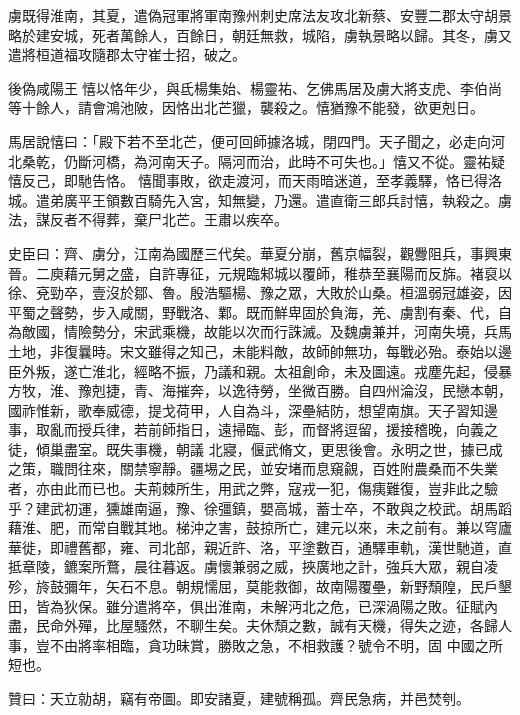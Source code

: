 \begin{pinyinscope}
 虜既得淮南，其夏，遣偽冠軍將軍南豫州刺史席法友攻北新蔡、安豐二郡太守胡景略於建安城，死者萬餘人，百餘日，朝廷無救，城陷，虜執景略以歸。其冬，虜又遣將桓道福攻隨郡太守崔士招，破之。



 後偽咸陽王憘以恪年少，與氐楊集始、楊靈祐、乞佛馬居及虜大將支虎、李伯尚等十餘人，請會鴻池陂，因恪出北芒獵，襲殺之。憘猶豫不能發，欲更剋日。



 馬居說憘曰：「殿下若不至北芒，便可回師據洛城，閉四門。天子聞之，必走向河北桑乾，仍斷河橋，為河南天子。隔河而治，此時不可失也。」憘又不從。靈祐疑憘反己，即馳告恪。憘聞事敗，欲走渡河，而天雨暗迷道，至孝義驛，恪已得洛城。遣弟廣平王領數百騎先入宮，知無變，乃還。遣直衛三郎兵討憘，執殺之。虜法，謀反者不得葬，棄尸北芒。王肅以疾卒。



 史臣曰：齊、虜分，江南為國歷三代矣。華夏分崩，舊京幅裂，觀釁阻兵，事興東晉。二庾藉元舅之盛，自許專征，元規臨邾城以覆師，稚恭至襄陽而反旆。褚裒以徐、兗勁卒，壹沒於鄒、魯。殷浩驅楊、豫之眾，大敗於山桑。桓溫弱冠雄姿，因平蜀之聲勢，步入咸關，野戰洛、鄴。既而鮮卑固於負海，羌、虜割有秦、代，自為敵國，情險勢分，宋武乘機，故能以次而行誅滅。及魏虜兼并，河南失境，兵馬土地，非復曩時。宋文雖得之知己，未能料敵，故師帥無功，每戰必殆。泰始以邊臣外叛，遂亡淮北，經略不振，乃議和親。太祖創命，未及圖遠。戎塵先起，侵暴方牧，淮、豫剋捷，青、海摧奔，以逸待勞，坐微百勝。自四州淪沒，民戀本朝，國祚惟新，歌奉威德，提戈荷甲，人自為斗，深壘結防，想望南旗。天子習知邊事，取亂而授兵律，若前師指日，遠掃臨、彭，而督將逗留，援接稽晚，向義之徒，傾巢盡室。既失事機，朝議
 北寢，偃武脩文，更思後會。永明之世，據已成之策，職問往來，關禁寧靜。疆埸之民，並安堵而息窺覦，百姓附農桑而不失業者，亦由此而已也。夫荊棘所生，用武之弊，寇戎一犯，傷痍難復，豈非此之驗乎？建武初運，獯雄南逼，豫、徐彊鎮，嬰高城，蓄士卒，不敢與之校武。胡馬蹈藉淮、肥，而常自戰其地。梯沖之害，鼓掠所亡，建元以來，未之前有。兼以穹廬華徙，即禮舊都，雍、司北部，親近許、洛，平塗數百，通驛車軌，漢世馳道，直抵章陵，鑣案所鶩，晨往暮返。虜懷兼弱之威，挾廣地之計，強兵大眾，親自凌殄，旍鼓彌年，矢石不息。朝規懦屈，莫能救御，故南陽覆壘，新野頹隍，民戶墾田，皆為狄保。雖分遣將卒，俱出淮南，未解沔北之危，已深渦陽之敗。征賦內盡，民命外殫，比屋騷然，不聊生矣。夫休頹之數，誠有天機，得失之迹，各歸人事，豈不由將率相臨，貪功昧賞，勝敗之急，不相救護？號令不明，固
 中國之所短也。



 贊曰：天立勍胡，竊有帝圖。即安諸夏，建號稱孤。齊民急病，并邑焚刳。



\end{pinyinscope}